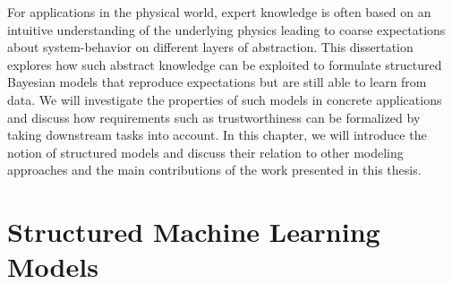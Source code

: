 For applications in the physical world, expert knowledge is often based on an intuitive understanding of the underlying physics leading to coarse expectations about system-behavior on different layers of abstraction.
This dissertation explores how such abstract knowledge can be exploited to formulate structured Bayesian models that reproduce expectations but are still able to learn from data.
We will investigate the properties of such models in concrete applications and discuss how requirements such as trustworthiness can be formalized by taking downstream tasks into account.
In this chapter, we will introduce the notion of structured models and discuss their relation to other modeling approaches and the main contributions of the work presented in this thesis.


\section{Structured Machine Learning Models}
